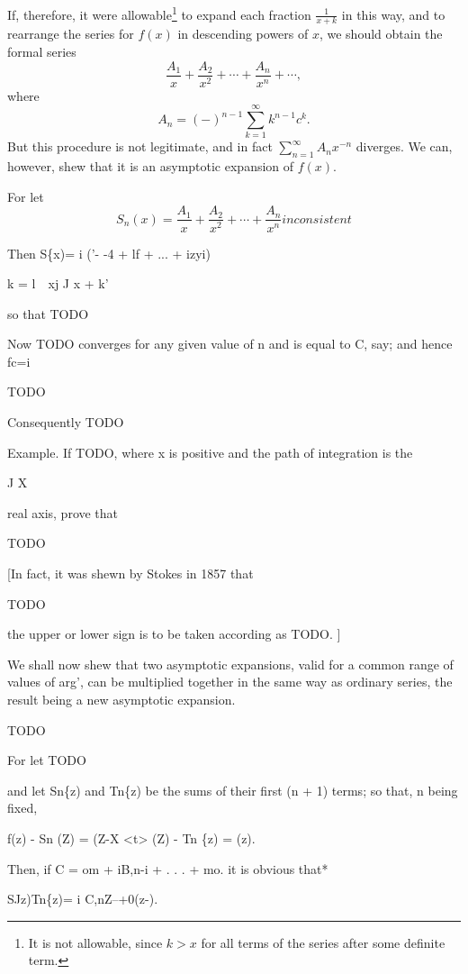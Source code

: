 If, therefore, it were allowable\footnote{It is not allowable, since
$k>x$ for all terms of the series after some definite term.} to expand
each fraction $\frac{1}{x+k}$ in this way, and to rearrange the series
for $f(x)$ in descending powers of $x$, we should obtain the formal
series
$$
\frac{A_{1}}{x} + \frac{A_{2}}{x^{2}} + \cdots + \frac{A_{n}}{x^{n}} +
\cdots,
$$
where
$$
A_{n} = (-)^{n-1} \sum_{k=1}^{\infty} k^{n-1} c^{k}.
$$
But this procedure is not legitimate, and in fact $\sum_{n=1}^{\infty}
A_{n} x^{-n}$ diverges. We can, however, shew that it is an asymptotic
expansion of $f(x)$.

For let
$$
S_{n}(x) = \frac{A_{1}}{x} + \frac{A_{2}}{x^{2}} + \cdots +
\frac{A_{n}}{x^{n}} %
inconsistent
$$

Then S\{x)= i ('- -4 + lf + ... + izyi)

k = l\ \ xj J x + k'

so that TODO

Now TODO converges for any given value of n and is equal to C, say;
and hence fc=i

TODO

Consequently TODO

Example. If TODO, where x is positive and the path of integration is
the

J X

real axis, prove that

TODO

[In fact, it was shewn by Stokes in 1857 that

TODO

the upper or lower sign is to be taken according as TODO. ]

We shall now shew that two asymptotic expansions, valid for a common
range of values of arg', can be multiplied together in the same way
as ordinary series, the result being a new asymptotic expansion.

TODO

For let TODO

% 
% 
and let Sn\{z) and Tn\{z) be the sums of their first (n + 1) terms; so
that, n being fixed,

f(z) - Sn (Z) = (Z-X <t> (Z) - Tn \{z) = (z).

Then, if C = om + iB,n-i + . . . + mo. it is obvious that*

SJz)Tn\{z)= i C,nZ--+0(z-).

